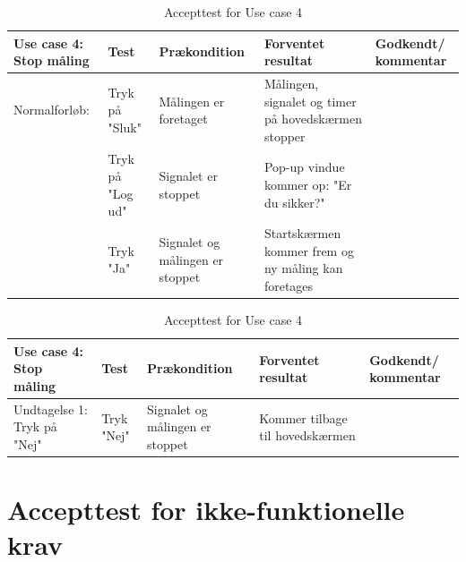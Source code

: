 \begin{table}[H]
\caption{Accepttest for Use case 4}\label{tab:tabel16}
\begin{tabular}{|>{\raggedright\arraybackslash}p{2.5cm}| >{\raggedright\arraybackslash}p{2.9cm} | >{\raggedright\arraybackslash}p{2.9cm} | >{\raggedright\arraybackslash}p{2.9cm} | >{\raggedright\arraybackslash}p{2.8cm} |}
   \hline
   \textbf{Use case 4: Stop måling } &\textbf{Test}& \textbf{Prækondition} & \textbf{Forventet resultat} & \textbf{Godkendt/ kommentar}\\ \hline
   Normalforløb:& Tryk på "Sluk" & Målingen er foretaget & Målingen, signalet og timer på hovedskærmen stopper &\\\hline
   & Tryk på "Log ud" & Signalet er stoppet & Pop-up vindue kommer op: "Er du sikker?" &\\\hline
   &Tryk "Ja"&Signalet og målingen er stoppet& Startskærmen kommer frem og ny måling kan foretages &\\\hline
\end{tabular}
\end{table}


\begin{table}[H]
\caption{Accepttest for Use case 4}\label{tab:tabel17}
\begin{tabular}{|>{\raggedright\arraybackslash}p{2.5cm}| >{\raggedright\arraybackslash}p{2.9cm} | >{\raggedright\arraybackslash}p{2.9cm} | >{\raggedright\arraybackslash}p{2.9cm} | >{\raggedright\arraybackslash}p{2.8cm} |}
   \hline
   \textbf{Use case 4: Stop måling } &\textbf{Test}& \textbf{Prækondition} & \textbf{Forventet resultat} & \textbf{Godkendt/ kommentar}\\ \hline
Undtagelse 1: Tryk på "Nej" &Tryk "Nej" & Signalet og målingen er stoppet & Kommer tilbage til hovedskærmen &\\\hline
\end{tabular}
\end{table}


\newpage

\newpage

\newpage

\section{Accepttest for ikke-funktionelle krav}

